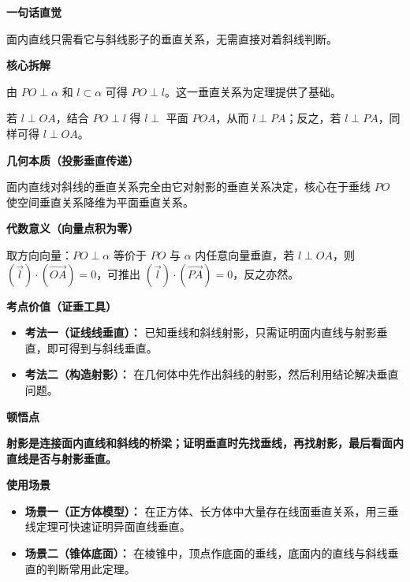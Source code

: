 \begin{explanationbox}

	\textbf{\textcolor{CExplanation}{一句话直觉}}

	面内直线只需看它与斜线影子的垂直关系，无需直接对着斜线判断。

	\medskip
	\textbf{\textcolor{CExplanation}{核心拆解}}
	\begin{description}[style=nextline, leftmargin=2.8em, labelsep=0.5em, itemsep=0.45em]
		\item[\textbf{要点一（线面垂直基石）：}] 由 $PO\perp\alpha$ 和 $l\subset\alpha$ 可得 $PO\perp l$。这一垂直关系为定理提供了基础。
		\item[\textbf{要点二（垂直传递桥梁）：}] 若 $l\perp OA$，结合 $PO\perp l$ 得 $l\perp$ 平面 $POA$，从而 $l\perp PA$；反之，若 $l\perp PA$，同样可得 $l\perp OA$。
	\end{description}

	\medskip
	\textbf{\textcolor{CExplanation}{几何本质（投影垂直传递）}}

	面内直线对斜线的垂直关系完全由它对射影的垂直关系决定，核心在于垂线 $PO$ 使空间垂直关系降维为平面垂直关系。

	\medskip
	\textbf{\textcolor{CExplanation}{代数意义（向量点积为零）}}

	取方向向量：$PO\perp\alpha$ 等价于 $PO$ 与 $\alpha$ 内任意向量垂直，若 $l\perp OA$，则 $(\vec{l})\cdot(\vec{OA})=0$，可推出 $(\vec{l})\cdot(\vec{PA})=0$，反之亦然。

	\medskip
	\textbf{\textcolor{CExplanation}{考点价值（证垂工具）}}
	\begin{itemize}[leftmargin=*, itemsep=0.5em, topsep=0.4em]
		\item \textbf{考法一（证线线垂直）：} 已知垂线和斜线射影，只需证明面内直线与射影垂直，即可得到与斜线垂直。
		\item \textbf{考法二（构造射影）：} 在几何体中先作出斜线的射影，然后利用结论解决垂直问题。
	\end{itemize}

	\medskip
	\textbf{\textcolor{CExplanation}{顿悟点}}

	\textbf{射影是连接面内直线和斜线的桥梁；证明垂直时先找垂线，再找射影，最后看面内直线是否与射影垂直。}

	\medskip
	\textbf{\textcolor{CExplanation}{使用场景}}
	\begin{itemize}[leftmargin=*, itemsep=0.5em, topsep=0.4em]
		\item \textbf{场景一（正方体模型）：} 在正方体、长方体中大量存在线面垂直关系，用三垂线定理可快速证明异面直线垂直。
		\item \textbf{场景二（锥体底面）：} 在棱锥中，顶点作底面的垂线，底面内的直线与斜线垂直的判断常用此定理。
	\end{itemize}
\end{explanationbox}
